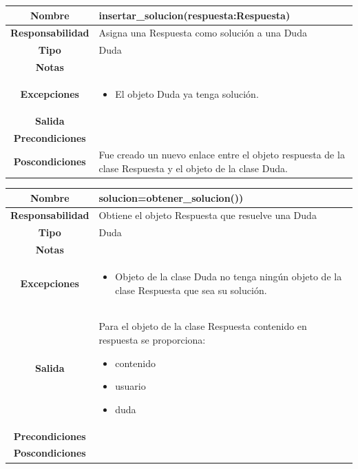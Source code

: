 \clearpage

                       \begin{table}[!ht]
\begin{tabular}{|c|m{10cm}|}
\hline\rowcolor{Gray}
{\bf Nombre } & {insertar\_solucion(respuesta:Respuesta)}\\
\hline
{\bf Responsabilidad } & {Asigna una Respuesta como solución a una Duda}\\
\hline
\rowcolor{Gray}
{\bf Tipo } & {Duda} \\
\hline
{\bf Notas } & { } \\
\hline
\rowcolor{Gray}
{\bf Excepciones }& {
	   	\begin{itemize}
	  \item El objeto Duda ya tenga solución.
	    \end{itemize}
} \\
\hline
{\bf Salida }& 
	  {
} 
 \\
\hline
\rowcolor{Gray}
{\bf Precondiciones }& {
}\\
\hline
{\bf Poscondiciones }& { 
Fue creado un nuevo enlace entre el objeto respuesta de la clase Respuesta y el objeto de la clase Duda.}	  
  \\
\hline
\end{tabular}

\end{table}

\clearpage

                       \begin{table}[!ht]
\begin{tabular}{|c|m{10cm}|}
\hline\rowcolor{Gray}
{\bf Nombre } & {solucion=obtener\_solucion())}\\
\hline
{\bf Responsabilidad } & {Obtiene el objeto Respuesta que resuelve una Duda}\\
\hline
\rowcolor{Gray}
{\bf Tipo } & {Duda} \\
\hline
{\bf Notas } & { } \\
\hline
\rowcolor{Gray}
{\bf Excepciones }& {
	   	\begin{itemize}
	  \item Objeto de la clase Duda no tenga ningún objeto de la clase Respuesta que sea su solución.
	    \end{itemize}
} \\
\hline
{\bf Salida }& 
	  { Para el objeto de la clase Respuesta contenido en respuesta  se proporciona:
	   	\begin{itemize}
	  \item contenido
	  \item usuario
	  \item duda
	    \end{itemize}
} 
 \\
\hline
\rowcolor{Gray}
{\bf Precondiciones }& {
}\\
\hline
{\bf Poscondiciones }& { 
  }
  \\
\hline
\end{tabular}

\end{table}


